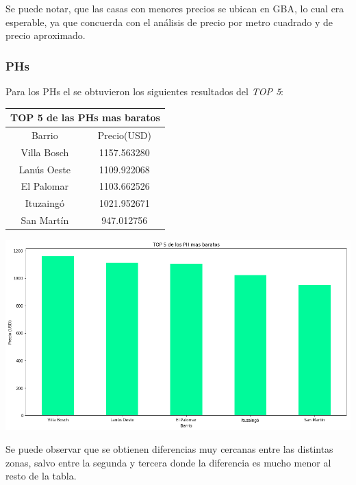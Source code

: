 \documentclass[a4paper, 10pt]{article}
\begin{document}
				Se puede notar, que las casas con menores precios se ubican en GBA, lo cual era esperable, ya que concuerda con el análisis de precio por metro cuadrado y de precio aproximado.

				\subsubsection{PHs}

					Para los PHs el se obtuvieron los siguientes resultados del \emph{TOP 5}:

					\begin{center}
						\begin{tabular}{ |c|c| }
							\hline
							\multicolumn{2}{|c|}{TOP 5 de las PHs mas baratos}\\
							\hline
							\hline
							Barrio & Precio(USD)\\
							\hline
							Villa Bosch & 1157.563280 \\
							Lanús Oeste & 1109.922068 \\
							El Palomar & 1103.662526 \\
							Ituzaingó & 1021.952671 \\
							San Martín & 947.012756 \\

							\hline
						\end{tabular}
					\end{center}

				\begin{center}
   		    				\includegraphics[width=\textwidth]{images/topPHb}
				\end{center}

				Se puede observar que se obtienen diferencias muy cercanas entre las distintas zonas, salvo entre la segunda y tercera donde la diferencia es mucho menor al resto de la tabla.
\end{document}
